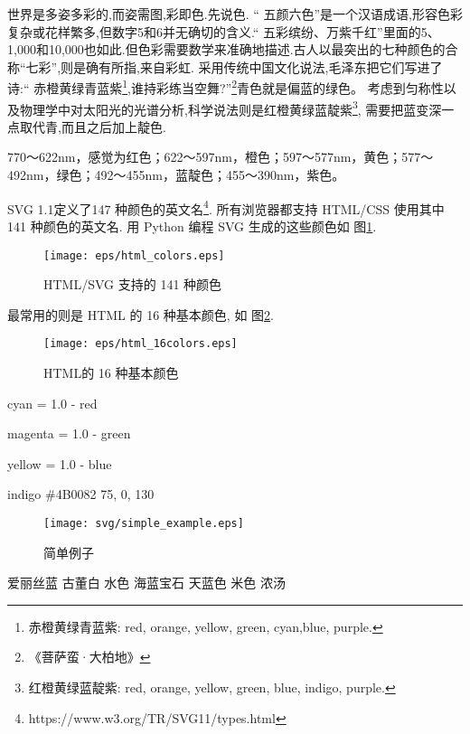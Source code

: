 \documentclass[main.tex]{subfiles}
\begin{document}
世界是多姿多彩的,而姿需图,彩即色.先说色.
“ 五颜六色”是一个汉语成语,形容色彩复杂或花样繁多,但数字5和6并无确切的含义.“ 
五彩缤纷、万紫千红”里面的5、1,000和10,000也如此.但色彩需要数学来准确地描述.古人以最突出的七种颜色的合称“七彩”,则是确有所指,来自彩虹.
采用传统中国文化说法,毛泽东把它们写进了诗:“ 赤橙黄绿青蓝紫\footnote{赤橙黄绿青蓝紫: red, orange, yellow, green, cyan,blue, purple.},谁持彩练当空舞?”\footnote{《菩萨蛮·大柏地》}青色就是偏蓝的绿色。
考虑到匀称性以及物理学中对太阳光的光谱分析,科学说法则是红橙黄绿蓝靛紫\footnote{红橙黄绿蓝靛紫: red, orange, yellow, green, blue, indigo, purple.},
需要把蓝变深一点取代青,而且之后加上靛色.

770～622nm，感觉为红色；622～597nm，橙色；597～577nm，黄色；577～492nm，绿色；492～455nm，蓝靛色；455～390nm，紫色。

SVG 1.1定义了147 种颜色的英文名\footnote{https://www.w3.org/TR/SVG11/types.html}.
所有浏览器都支持 HTML/CSS 使用其中 141 种颜色的英文名.
用 Python 编程 SVG 生成的这些颜色如 图\ref{fig:1.4.2}.

\begin{figure}
	\centering
	\texttt{[image: eps/html\_colors.eps]}
	\caption{HTML/SVG 支持的 141 种颜色}
	\label{fig:1.4.2}
\end{figure}

最常用的则是 HTML 的 16 种基本颜色, 如 图\ref{fig:1.4.3}.

\begin{figure}
	\centering
	\texttt{[image: eps/html\_16colors.eps]}
	\caption{HTML的 16 种基本颜色}
	\label{fig:1.4.3}
\end{figure}

cyan = 1.0 - red

magenta = 1.0 - green

yellow = 1.0 - blue

indigo \#4B0082 75, 0, 130

\begin{figure}
	\centering
	\texttt{[image: svg/simple\_example.eps]}
	\caption{简单例子}
	\label{fig:I.1.}
\end{figure}



爱丽丝蓝%
古董白%
水色%
海蓝宝石%
天蓝色%
米色%
浓汤%
\end{document}
